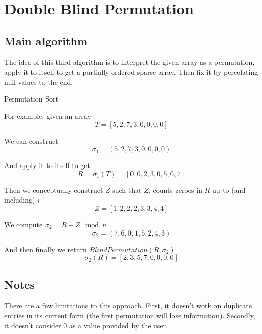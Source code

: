 \documentclass{article}
\begin{document}
\newpage

\section{Double Blind Permutation}

\subsection{Main algorithm}

The idea of this third algorithm is to interpret the given array as a permutation, apply it to itself to get a partially ordered sparse array. Then fix it by percolating null values to the end.

\begin{algorithm}
    \caption{Permutation Sort}
    \begin{algorithmic}
            \State{$\sigma \gets [0, \dots, 0]$}
            \EndFor{}

        \EndFunction{}
    \end{algorithmic}
\end{algorithm}

For example, given an array \[T = [5, 2, 7, 3, 0, 0, 0, 0]\]

We can construct \[\sigma_1 = (5, 2, 7, 3, 0, 0, 0, 0)\]

And apply it to itself to get \[R = \sigma_1(T) = [0, 0, 2, 3, 0, 5, 0, 7]\]

Then we conceptually construct $Z$ such that $Z_i$ counts zeroes in $R$ up to (and including) $i$ \[ Z = [1, 2, 2, 2, 3, 3, 4, 4] \]

We compute $\sigma_2 = R - Z \mod n$ \[ \sigma_2 = (7, 6, 0, 1, 5, 2, 4, 3) \]

And then finally we return $BlindPermutation(R, \sigma_2)$ \[ \sigma_2(R) = [2, 3, 5, 7, 0, 0, 0, 0]\]

\subsection*{Notes}

There are a few limitations to this approach. First, it doesn't work on duplicate entries in its current form (the first permutation will lose information). Secondly, it doesn't consider $0$ as a value provided by the user.
\end{document}
